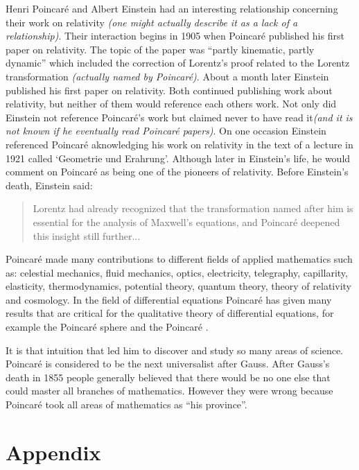 \documentclass[12pt]{article}
\begin{document}
Henri Poincar\'e and Albert Einstein had an interesting 
relationship concerning their work on relativity \textit{(one might actually
describe it as a lack of a
relationship)}.  Their interaction begins in 1905 when Poincar\'e 
published his first paper on relativity.  The topic of the paper 
was ``partly kinematic, partly dynamic''\cite{PA} which included the 
correction of Lorentz's proof related to the Lorentz transformation 
\textit{(actually named by Poincar\'e)}. About a month later 
Einstein published his first paper on relativity.  Both continued 
publishing work about relativity, but neither of them would reference 
each others work.  Not only did Einstein not reference
Poincar\'e's work but claimed never to have read it\textit{(and it is not known if he eventually read
Poincar\'e papers)}\cite{PA}.  On one occasion Einstein referenced 
Poincar\'e aknowledging his work on relativity in the text of a 
lecture in 1921 called `Geometrie und Erahrung'.\cite{PA}  Although 
later in Einstein's life, he would comment on Poincar\'e as being 
one of the pioneers of relativity. Before Einstein's death, Einstein said:
\begin{quote}
Lorentz had already recognized that the transformation named after him is
essential for the analysis of Maxwell's equations, and Poincar\'e deepened
this insight still further...\cite{PA}
\end{quote}



Poincar\'e made many contributions to different fields of applied mathematics such as: celestial mechanics, fluid mechanics, optics, electricity, telegraphy, capillarity, elasticity, thermodynamics, potential theory, quantum theory, theory of relativity and cosmology.  In the field of differential equations Poincar\'e has given many results that are critical for the qualitative theory of differential equations, for example the Poincar\'e sphere and the Poincar\'e .

It is that intuition that led him to discover and study so many areas of science.  Poincar\'e is considered to be the next universalist after Gauss.  After Gauss's death in 1855 people generally believed that there would be no one else that could master all branches of mathematics. However they were wrong because Poincar\'e took all areas of mathematics as ``his province''\cite{BC}.
\section{Appendix}
\end{document}
